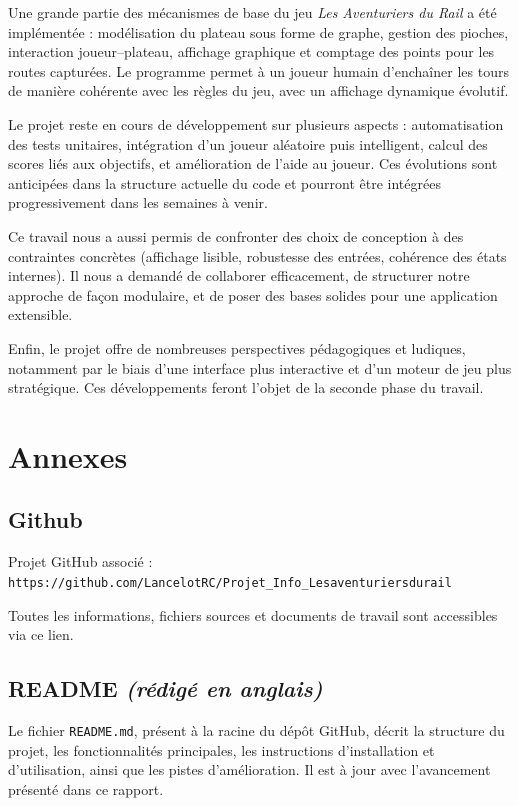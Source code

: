 \documentclass[a4paper,12pt]{report}
\begin{document}
Une grande partie des mécanismes de base du jeu \textit{Les Aventuriers du Rail} a été implémentée : modélisation du
plateau sous forme de graphe, gestion des pioches, interaction joueur–plateau, affichage graphique et comptage des
points pour les routes capturées. Le programme permet à un joueur humain d’enchaîner les tours de manière cohérente
avec les règles du jeu, avec un affichage dynamique évolutif.

Le projet reste en cours de développement sur plusieurs aspects : automatisation des tests unitaires, intégration d’un
joueur aléatoire puis intelligent, calcul des scores liés aux objectifs, et amélioration de l’aide au joueur.
Ces évolutions sont anticipées dans la structure actuelle du code et pourront être intégrées progressivement dans les
semaines à venir.

Ce travail nous a aussi permis de confronter des choix de conception à des contraintes concrètes (affichage lisible,
robustesse des entrées, cohérence des états internes). Il nous a demandé de collaborer efficacement, de structurer
notre approche de façon modulaire, et de poser des bases solides pour une application extensible.

Enfin, le projet offre de nombreuses perspectives pédagogiques et ludiques, notamment par le biais d’une interface plus
interactive et d’un moteur de jeu plus stratégique. Ces développements feront l’objet de la seconde phase du travail.

\appendix

\chapter*{Annexes}


\section*{Github}
Projet GitHub associé : \texttt{https://github.com/LancelotRC/Projet\_Info\_Lesaventuriersdurail}

Toutes les informations, fichiers sources et documents de travail sont accessibles via ce lien.

\section*{README \textit{(rédigé en anglais)}}

Le fichier \texttt{README.md}, présent à la racine du dépôt GitHub, décrit la structure du projet, les fonctionnalités
principales, les instructions d’installation et d’utilisation, ainsi que les pistes d’amélioration.
Il est à jour avec l’avancement présenté dans ce rapport.
\end{document}
